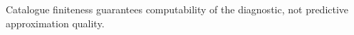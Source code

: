 Catalogue finiteness guarantees computability of the diagnostic, not predictive approximation quality.